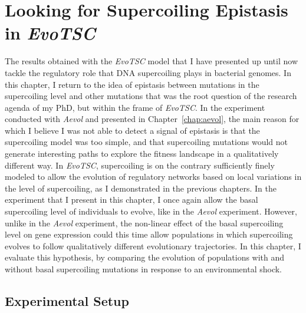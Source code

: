 \chapter{Looking for Supercoiling Epistasis in \emph{EvoTSC}}

The results obtained with the \emph{EvoTSC} model that I have presented up until now tackle the regulatory role that DNA supercoiling plays in bacterial genomes.
In this chapter, I return to the idea of epistasis between mutations in the supercoiling level and other mutations that was the root question of the research agenda of my PhD, but within the frame of \emph{EvoTSC}.
In the experiment conducted with \emph{Aevol} and presented in Chapter~\ref{chap:aevol}, the main reason for which I believe I was not able to detect a signal of epistasis is that the supercoiling model was too simple, and that supercoiling mutations would not generate interesting paths to explore the fitness landscape in a qualitatively different way.
In \emph{EvoTSC}, supercoiling is on the contrary sufficiently finely modeled to allow the evolution of regulatory networks based on local variations in the level of supercoiling, as I demonstrated in the previous chapters.
In the experiment that I present in this chapter, I once again allow the basal supercoiling level of individuals to evolve, like in the \emph{Aevol} experiment.
However, unlike in the \emph{Aevol} experiment, the non-linear effect of the basal supercoiling level on gene expression could this time allow populations in which supercoiling evolves to follow qualitatively different evolutionary trajectories.
In this chapter, I evaluate this hypothesis, by comparing the evolution of populations with and without basal supercoiling mutations in response to an environmental shock.


\section{Experimental Setup}

